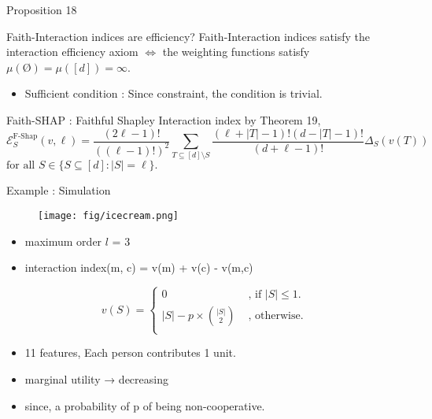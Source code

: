 \documentclass[10pt]{beamer}
\newcommand{\f}{v}
\def\Expl{\mathcal{E}}
\begin{document}
\begin{frame}{Proposition 18}
    \begin{myaxiombox}{Faith-Interaction indices are efficiency?}
        Faith-Interaction indices satisfy the interaction efficiency axiom $\iff$
        the weighting functions satisfy $\mu(\text{\O}) = \mu([d]) = \infty$.
    \end{myaxiombox}
    \begin{itemize}[label=\scalebox{0.5}{$\blacksquare$}]
        \item Sufficient condition : Since constraint, the condition is trivial.

    \end{itemize}
\end{frame}
\begin{frame}{Faith-SHAP : Faithful Shapley Interaction index}
    by Theorem 19,
    \begin{equation*}
    \label{eqn:faith_shapley_highest_order}
    \Expl_S^{\text{F-Shap}}(\f,\ell) = \frac{(2\ell -1)!}{((\ell-1)!)^2}
    \sum_{T \subseteq [d] \setminus S}\frac{(\ell+|T|-1)!(d-|T|-1)!}{(d+\ell-1)!}   \Delta_S(\f(T))
    \ \ 
    \end{equation*}
    $\text{for all } S \in \{ S \subseteq [d] : |S| = \ell \}.$
\end{frame}
\begin{frame}{Example : Simulation}
    \begin{figure}
    \centering
    \texttt{[image: fig/icecream.png]}
    \end{figure}
    \begin{itemize}[label=\scalebox{0.5}{$\blacksquare$}]
        \item maximum order $l$ = 3
        \item interaction index(m, c) = v(m) + v(c) - v(m,c)
    \end{itemize}
    
\end{frame}
\begin{frame}
    \begin{equation}
    \label{eqn:example1}
    \f(S) = 
    \begin{cases}
    0  & \text{ , if } |S| \leq 1. \\
    |S| - p \times { |S| \choose 2 }  & \text{ , otherwise.} \\
    \end{cases}
    \tag{18}
\end{equation}
\vspace{2em}
\begin{itemize}[label=\scalebox{0.5}{$\blacksquare$}]
    \item 11 features, Each person contributes 1 unit.
    \item marginal utility → decreasing
    \item since, a probability of p of being non-cooperative.
\end{itemize}
\end{frame}
\end{document}
